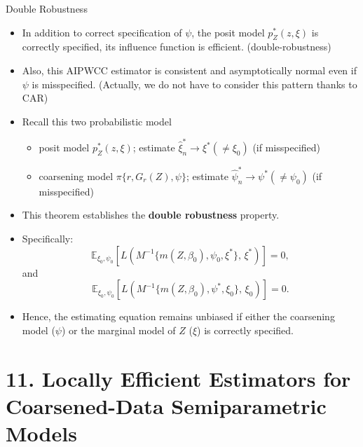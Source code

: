 \documentclass[xcolor=dvipsnames,aspectratio=169]{beamer}
\newcommand{\1}{\mathbbm{1}}
\begin{document}
\begin{frame}{Double Robustness}
  \begin{itemize}
    \item In addition to correct specification of $\psi$, the posit model $p_Z^*(z,\xi)$ is correctly specified, its influence function is \alert{efficient}. (double-robustness)
    \item Also, this AIPWCC estimator is consistent and asymptotically normal even if $\psi$ is misspecified. (Actually, we do not have to consider this pattern \alert{thanks to CAR})
    \item Recall this two probabilistic model
    \begin{itemize}
      \item posit model $p_Z^*(z,\xi)$; estimate $\hat{\xi}_n^* \rightarrow \xi^*(\neq \xi_0)$ (if misspecified)
      \item coarsening model $\pi\{r, G_r(Z),\psi\}$; estimate $\hat{\psi}_n^*\rightarrow \psi^*(\neq \psi_0)$ (if misspecified)
    \end{itemize} 
  \end{itemize}
\end{frame}

\begin{frame}
  \begin{tcolorbox}[colframe=Cyan,title=Theorem 10.8]
    \begin{itemize}
      \item This theorem establishes the \textbf{double robustness} property.
      \item Specifically:
      \[
        \mathbb{E}_{\xi_0,\psi_0}
        \left[
          L\!\left(M^{-1}\{m(Z,\beta_0),\psi_0,\xi^\ast\},\,\xi^\ast\right)
        \right] = 0,
      \]
      and
      \[
        \mathbb{E}_{\xi_0,\psi_0}
        \left[
          L\!\left(M^{-1}\{m(Z,\beta_0),\psi^\ast,\xi_0\},\,\xi_0\right)
        \right] = 0.
      \]
      \item Hence, the estimating equation remains unbiased if either
      the coarsening model ($\psi$) or the marginal model of $Z$ ($\xi$) is correctly specified.
    \end{itemize}
  \end{tcolorbox}
\end{frame}

\section{11. Locally Efficient Estimators for Coarsened-Data Semiparametric Models}
\end{document}
